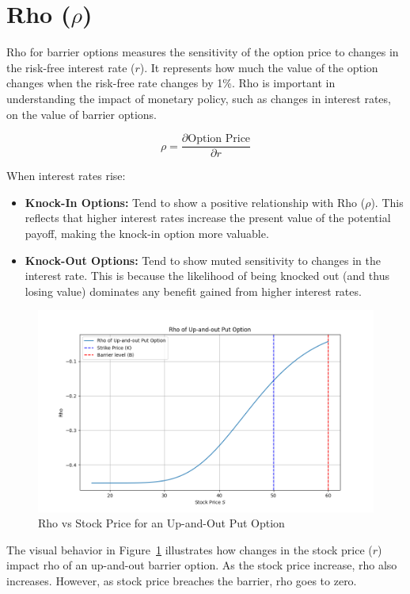 \section{Rho (\(\rho\))}

Rho for barrier options measures the sensitivity of the option price to changes in the risk-free interest rate (\(r\)). It represents how much the value of the option changes when the risk-free rate changes by 1\%. Rho is important in understanding the impact of monetary policy, such as changes in interest rates, on the value of barrier options.

\[
\rho = \frac{\partial \text{Option Price}}{\partial r}
\]

When interest rates rise:
\begin{itemize}
	\item \textbf{Knock-In Options:} Tend to show a positive relationship with Rho (\(\rho\)). This reflects that higher interest rates increase the present value of the potential payoff, making the knock-in option more valuable.
	\item \textbf{Knock-Out Options:} Tend to show muted sensitivity to changes in the interest rate. This is because the likelihood of being knocked out (and thus losing value) dominates any benefit gained from higher interest rates.
\end{itemize}
\begin{figure}[H]
    \centering
    \includegraphics[width=.65\linewidth]{content/images/rho.png}
    \caption{Rho vs Stock Price for an Up-and-Out Put Option}
    \label{fig:rho_behavior}
\end{figure}

The visual behavior in Figure~\ref{fig:rho_behavior} illustrates how changes in the stock price (\(r\)) impact rho of an up-and-out barrier option. As the stock price increase, rho also increases. However, as stock price breaches the barrier, rho goes to zero.